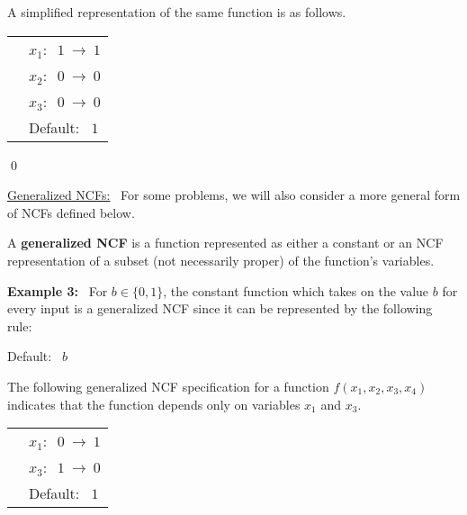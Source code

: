 \medskip
\noindent
A simplified representation of the same function is as follows.

\bigskip

\noindent
\begin{tabular}{ll}
\hspace*{1.1in} & $x_1:~$  $1 ~\longrightarrow~ 1$ \\ [1ex]
\hspace*{1.1in} & $x_2:~$  $0 ~\longrightarrow~ 0$ \\ [1ex]
\hspace*{1.1in} & $x_3:~$  $0 ~\longrightarrow~ 0$ \\ [1ex]
\hspace*{1.1in} & Default:~ $1$ \\
\end{tabular}

\noindent
\qed


\noindent
\underline{\textsf{Generalized NCFs:}}~
For some problems, we will also consider a more general form
of NCFs defined below.

\begin{definition}\label{def:generalized ncf}
A {\bf generalized NCF} is a function represented as either a constant
or an NCF representation of a subset (not necessarily proper) 
of the function's variables.
\end{definition}

\noindent
\textbf{Example 3:}~ For $b \in \{0,1\}$, the constant function which takes 
on the value $b$ for every input is a generalized NCF since 
it can be represented by the following rule: 

\smallskip

\hspace*{1.1in} Default:~ $b$ 

\smallskip

\noindent
The following generalized NCF specification for 
a function $f(x_1, x_2, x_3, x_4)$ indicates that the function
depends only on variables $x_1$ and $x_3$.

\medskip

\noindent
\begin{tabular}{ll}
\hspace*{1.1in} & $x_1:~$  $0 ~\longrightarrow~ 1$ \\ [1ex]
\hspace*{1.1in} & $x_3:~$  $1 ~\longrightarrow~ 0$ \\ [1ex]
\hspace*{1.1in} & Default:~ $1$ \\
\end{tabular}

